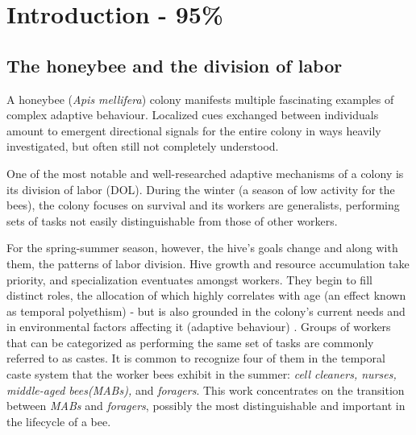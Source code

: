 
\chapter{Introduction - 95\%}  %

\ifpdf
    \graphicspath{{Chapters/Chapter1/Figs/Raster/}{Chapters/Chapter1/Figs/PDF/}{Chapters/Chapter1/Figs/}}
\else
    \graphicspath{{Chapters/Chapter1/Figs/Vector/}{Chapters/Chapter1/Figs/}}
\fi


\section{The honeybee and the division of labor} %

A honeybee (\textit{Apis mellifera}) colony manifests multiple fascinating
examples of complex adaptive behaviour. Localized cues exchanged between
individuals amount to emergent directional signals for the entire colony in ways
heavily investigated, but often still not completely understood. 

One of the most notable and well-researched adaptive mechanisms of a colony is
its division of labor (DOL). During the winter (a season of low activity for the
bees), the colony focuses on survival and its workers are generalists,
performing sets of tasks not easily distinguishable from those of other workers.


For the spring-summer season, however, the hive’s goals change and along with
them, the patterns of labor division. Hive growth and resource accumulation take
priority, and specialization eventuates amongst workers. They begin to fill
distinct roles, the allocation of which highly correlates with age (an effect
known as temporal polyethism) - but is also grounded in the colony’s current
needs and in environmental factors affecting it (adaptive behaviour)
\citep{seeley_adaptive_1982}. Groups of workers that can be categorized as
performing the same set of tasks are commonly referred to as castes. It is
common to recognize four of them in the temporal caste system that the worker
bees exhibit in the summe\citep{johnson_division_2010}r: 
\textit{cell cleaners, nurses, middle-aged bees(MABs),} and \textit{foragers}. 
This work concentrates on the transition between
\textit{MABs} and \textit{foragers}, possibly the most distinguishable and
important in the lifecycle of a bee.


